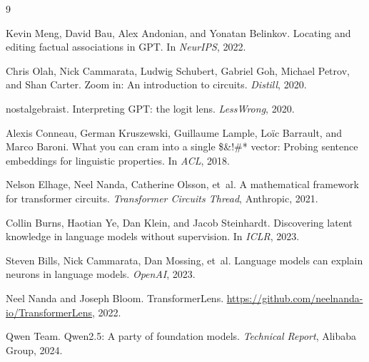 \documentclass[11pt,a4paper]{article}
\begin{document}

\begin{thebibliography}{9}

Kevin Meng, David Bau, Alex Andonian, and Yonatan Belinkov.
\newblock Locating and editing factual associations in {GPT}.
\newblock In \emph{NeurIPS}, 2022.

Chris Olah, Nick Cammarata, Ludwig Schubert, Gabriel Goh, Michael Petrov, and Shan Carter.
\newblock Zoom in: An introduction to circuits.
\newblock \emph{Distill}, 2020.

nostalgebraist.
\newblock Interpreting {GPT}: the logit lens.
\newblock \emph{LessWrong}, 2020.

Alexis Conneau, German Kruszewski, Guillaume Lample, Lo\"ic Barrault, and Marco Baroni.
\newblock What you can cram into a single \$\&!\#* vector: Probing sentence embeddings for linguistic properties.
\newblock In \emph{ACL}, 2018.

Nelson Elhage, Neel Nanda, Catherine Olsson, et~al.
\newblock A mathematical framework for transformer circuits.
\newblock \emph{Transformer Circuits Thread}, Anthropic, 2021.

Collin Burns, Haotian Ye, Dan Klein, and Jacob Steinhardt.
\newblock Discovering latent knowledge in language models without supervision.
\newblock In \emph{ICLR}, 2023.

Steven Bills, Nick Cammarata, Dan Mossing, et~al.
\newblock Language models can explain neurons in language models.
\newblock \emph{OpenAI}, 2023.

Neel Nanda and Joseph Bloom.
\newblock TransformerLens.
\newblock \url{https://github.com/neelnanda-io/TransformerLens}, 2022.

Qwen Team.
\newblock Qwen2.5: A party of foundation models.
\newblock \emph{Technical Report}, Alibaba Group, 2024.

\end{thebibliography}
\end{document}
